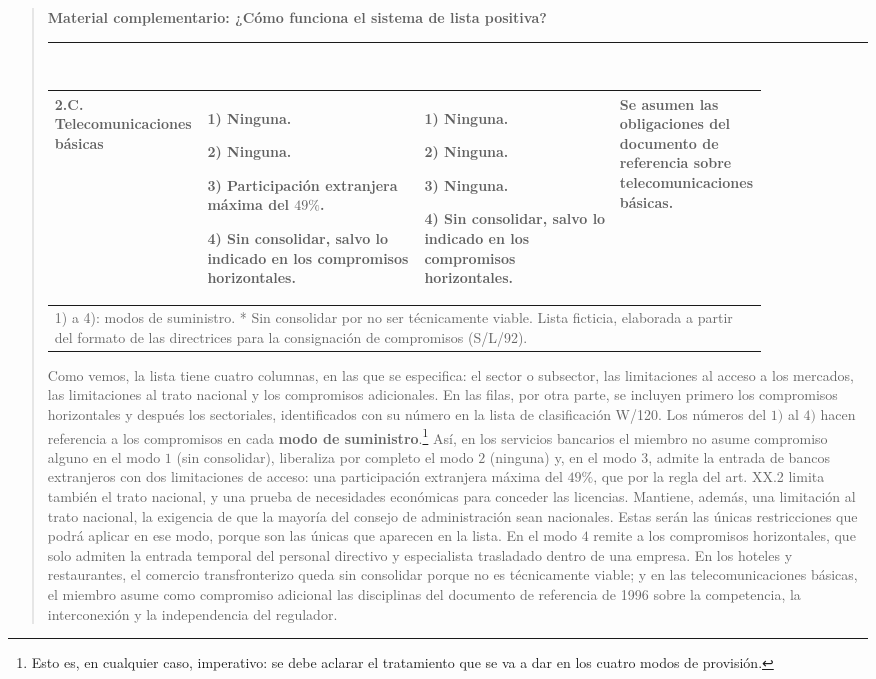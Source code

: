 \documentclass[10pt,a4paper]{article}
\newenvironment{specialblock}[1]{%
      \begin{quote} %
      \small %
      \noindent\textbf{#1}\\[-0.3em] %
      \rule{\linewidth}{0.4pt}\\[0.6em]}{
      \end{quote}}
\begin{document}
\begin{specialblock}{\textbf{Material complementario:} ¿Cómo funciona el sistema de lista positiva?}
\begin{center}
\begin{tabular}{|p{0.17\linewidth}|p{0.30\linewidth}|p{0.27\linewidth}|p{0.13\linewidth}|}
    \hline
    \textbf{2.C.} Telecomunicaciones básicas & 1) Ninguna.\par 2) Ninguna.\par 3) Participación extranjera máxima del $49\%$.\par 4) Sin consolidar, salvo lo indicado en los compromisos horizontales. & 1) Ninguna.\par 2) Ninguna.\par 3) Ninguna.\par 4) Sin consolidar, salvo lo indicado en los compromisos horizontales. & Se asumen las obligaciones del documento de referencia sobre telecomunicaciones básicas. \\
    \hline
    \multicolumn{4}{|l|}{\tiny 1) a 4): modos de suministro. * Sin consolidar por no ser técnicamente viable. Lista ficticia, elaborada a partir del formato de las directrices para la consignación de compromisos (S/L/92).} \\
    \hline
    \end{tabular}
    \end{center}

    Como vemos, la lista tiene cuatro columnas, en las que se especifica: el sector o subsector, las limitaciones al acceso a los mercados, las limitaciones al trato nacional y los compromisos adicionales. En las filas, por otra parte, se incluyen primero los compromisos horizontales y después los sectoriales, identificados con su número en la lista de clasificación W/120. Los números del $1)$ al $4)$ hacen referencia a los compromisos en cada \textbf{modo de suministro}.\footnote{%
        Esto es, en cualquier caso, imperativo: se debe aclarar el tratamiento que se va a dar en los cuatro modos de provisión.
    } Así, en los servicios bancarios el miembro no asume compromiso alguno en el modo $1$ (sin consolidar), liberaliza por completo el modo $2$ (ninguna) y, en el modo $3$, admite la entrada de bancos extranjeros con dos limitaciones de acceso: una participación extranjera máxima del $49\%$, que por la regla del art. XX.2 limita también el trato nacional, y una prueba de necesidades económicas para conceder las licencias. Mantiene, además, una limitación al trato nacional, la exigencia de que la mayoría del consejo de administración sean nacionales. Estas serán las únicas restricciones que podrá aplicar en ese modo, porque son las únicas que aparecen en la lista. En el modo $4$ remite a los compromisos horizontales, que solo admiten la entrada temporal del personal directivo y especialista trasladado dentro de una empresa. En los hoteles y restaurantes, el comercio transfronterizo queda sin consolidar porque no es técnicamente viable; y en las telecomunicaciones básicas, el miembro asume como compromiso adicional las disciplinas del documento de referencia de 1996 sobre la competencia, la interconexión y la independencia del regulador.


\end{specialblock}
\end{document}
